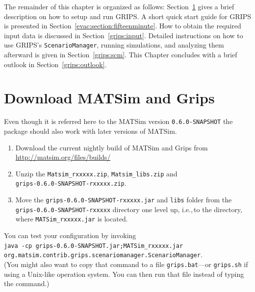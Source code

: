 The remainder of this chapter is organized as follows: Section~\ref{grips:install} gives a brief description on how to setup and run GRIPS. 
A short quick start guide for GRIPS is presented in Section~\ref{evac:section:fifteenminute}. How to obtain the required input data is discussed in Section~\ref{grips:input}. Detailed instructions on how to use GRIPS's \lstinline|ScenarioManager|, running simulations, and analyzing them afterward is given in Section~\ref{grips:scm}. This Chapter concludes with a brief outlook in Section~\ref{grips:outlook}.

\section{Download MATSim and Grips}
\label{grips:install}
Even though it is referred here to the MATSim version \lstinline|0.6.0-SNAPSHOT| the package should also work with later versions of MATSim.
\begin{enumerate}
\item 
Download the current nightly build of MATSim and Grips from
\url{http://matsim.org/files/builds/}
\item 
Unzip the \lstinline|Matsim_rxxxxx.zip|, \lstinline|Matsim_libs.zip| and\\
 \lstinline|grips-0.6.0-SNAPSHOT-rxxxxx.zip|.
\item 
Move the \lstinline|grips-0.6.0-SNAPSHOT-rxxxxx.jar| and \lstinline|libs| folder from the \lstinline|grips-0.6.0-SNAPSHOT-rxxxxx| directory one level up, 
i.e.,\,to the directory, where \lstinline|MATSim_rxxxxx.jar| is located.
\end{enumerate}

You can test your configuration by invoking\\ 
\lstinline|java -cp grips-0.6.0-SNAPSHOT.jar;MATSim_rxxxxx.jar|\\ \lstinline|org.matsim.contrib.grips.scenariomanager.ScenarioManager|.\\
(You might also want to copy that command to a file \lstinline|grips.bat|---or \lstinline|grips.sh| if using a Unix-like operation system. You can then run that file instead of typing the command.)

